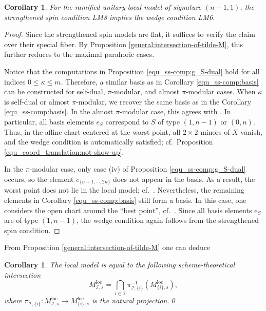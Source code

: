 \documentclass[pdflatex,sn-mathphys-num]{sn-jnl}%
\theoremstyle{thmstyleone}%
\newtheorem{corollary}[subsubsection]{Corollary}%
\theoremstyle{thmstyletwo}%
\numberwithin{equation}{subsection}
\theoremstyle{thmstylethree}%
\newcommand{\CI}{\ensuremath{\mathcal{I}}\xspace}
\newcommand{\loc}{\ensuremath{\mathrm{loc}}\xspace}
\begin{document}
\begin{corollary}\label{general:wedge-from-ss}
For the ramified unitary local model of signature $(n-1,1)$, the strengthened spin condition {\selectfont LM8} implies the wedge condition {\selectfont LM6}.
\end{corollary}
\begin{proof}
Since the strengthened spin models are flat, it suffices to verify the claim over their special fiber. By Proposition \ref{general:intersection-of-tilde-M}, this further reduces to the maximal parahoric cases.

Notice that the computations in Proposition \ref{equ_ss-comp:g_S-dual} hold for all indices $0\leq \kappa\leq m$. Therefore, a similar basis as in Corollary \ref{equ_ss-comp:basis} can be constructed for self-dual, $\pi$-modular, and almost $\pi$-modular cases.
When $\kappa$ is self-dual or almost $\pi$-modular, we recover the same basis as in the Corollary \ref{equ_ss-comp:basis}. In the almost $\pi$-modular case, this agrees with \cite[Corollary 4.14]{Smithling2015}.
In particular, all basis elements $e_S$ correspond to $S$ of type $(1,n-1)$ or $(0,n)$. 
Thus, in the affine chart centered at the worst point, all $2\times 2$-minors of $X$ vanish, and the wedge condition is automatically satisfied; cf.\ Proposition \ref{equ_coord_translation:not-show-up}.

In the $\pi$-modular case, only case (iv) of Proposition \ref{equ_ss-comp:g_S-dual} occurs, so the element $e_{\{n+1,\cdots,2n\}}$ does not appear in the basis. As a result, the worst point does not lie in the local model; cf.\ \cite[Remark 7.4]{PR2009}.
Nevertheless, the remaining elements in Corollary \ref{equ_ss-comp:basis} still form a basis.
In this case, one considers the open chart around the ``best point'', cf.\ \cite[\S 5.3]{PR2009}.
Since all basis elements $e_S$ are of type $(1,n-1)$, the wedge condition again follows from the strengthened spin condition.
\end{proof}
		
From Proposition \ref{general:intersection-of-tilde-M} one can deduce
\begin{corollary}\label{general:lm-vertex}
The local model is equal to the following scheme-theoretical intersection
\begin{equation*}
    M^\loc_{\CI,s}=\bigcap_{i\in \CI}\pi^{-1}_{\CI,\{i\}}(M^\loc_{\{i\},s}),
\end{equation*} 
where $\pi_{\CI,\{i\}}:M^\loc_{\CI,s}\rightarrow M^\loc_{\{i\},s}$ is the natural projection.\qed
\end{corollary}
		
\end{document}
